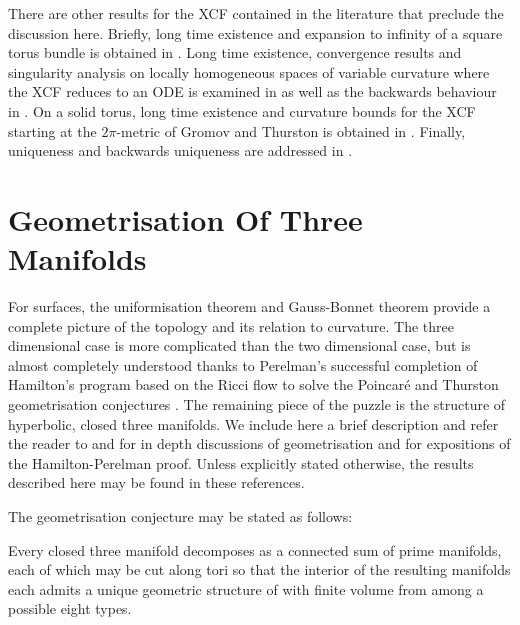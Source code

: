\documentclass[a4paper,12pt]{amsart}
\begin{document}
There are other results for the XCF contained in the literature that preclude the discussion here. Briefly, long time existence and expansion to infinity of a square torus bundle is obtained in \cite{MR2222245}. Long time existence, convergence results and singularity analysis on locally homogeneous spaces of variable curvature where the XCF reduces to an ODE is examined in \cite{MR2407107,MR2653711,MR2426751} as well as the backwards behaviour in \cite{MR2601352}. On a solid torus, long time existence and curvature bounds for the XCF starting at the \(2\pi\)-metric of Gromov and Thurston is obtained in \cite{MR2602839}. Finally, uniqueness and backwards uniqueness are addressed in \cite{MR3575926,MR3544962}.

\section{Geometrisation Of Three Manifolds}
\label{sec:geometrisation}

For surfaces, the uniformisation theorem and Gauss-Bonnet theorem provide a complete picture of the topology and its relation to curvature. The three dimensional case is more complicated than the two dimensional case, but is almost completely understood thanks to Perelman's successful completion \cite{2003math......7245P,2003math......3109P,2002math.....11159P} of Hamilton's program based on the Ricci flow \cite{Hamilton:/1982} to solve the Poincar\'e and Thurston geometrisation conjectures \cite{MR648524}. The remaining piece of the puzzle is the structure of hyperbolic, closed three manifolds. We include here a brief description and refer the reader to \cite{MR705527} and \cite{MR1435975} for in depth discussions of geometrisation and \cite{MR3186136,MR2334563,MR2460872} for expositions of the Hamilton-Perelman proof. Unless explicitly stated otherwise, the results described here may be found in these references.

The geometrisation conjecture may be stated as follows:

\begin{thm}
\label{thm:geometrisation}

Every closed three manifold decomposes as a connected sum of prime manifolds, each of which may be cut along tori so that the interior of the resulting manifolds each admits a unique geometric structure of with finite volume from among a possible eight types.
\end{thm}
\end{document}

